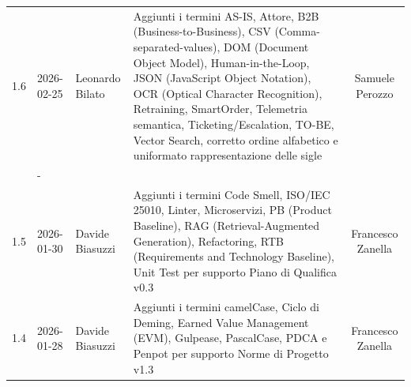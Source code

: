 \documentclass[a4paper, 11pt, oneside]{scrartcl} %
\begin{document}
\begin{center}
{\begin{tabular}{@{}llp{}p{}c@{}}
            1.6                                                                                                                                                            & 2026-02-25      & Leonardo Bilato   & Aggiunti i termini AS-IS, Attore, B2B (Business-to-Business), CSV (Comma-separated-values), DOM (Document Object Model), Human-in-the-Loop, JSON (JavaScript Object Notation), OCR (Optical Character Recognition),
            Retraining, SmartOrder, Telemetria semantica, Ticketing/Escalation, TO-BE, Vector Search, corretto ordine alfabetico e uniformato rappresentazione delle sigle & Samuele Perozzo                                                                                                                                                                                                                                                                                                                                                                                                                                                                                        \\                                                                                                                                   & -                     \\
            1.5                                                                                                                                                            & 2026-01-30      & Davide Biasuzzi   & Aggiunti i termini Code Smell, ISO/IEC 25010, Linter, Microservizi, PB (Product Baseline), RAG (Retrieval-Augmented Generation), Refactoring, RTB (Requirements and Technology Baseline), Unit Test per supporto Piano di Qualifica v0.3                                                                                                                                                                                                 & Francesco Zanella     \\
            1.4                                                                                                                                                            & 2026-01-28      & Davide Biasuzzi   & Aggiunti i termini camelCase, Ciclo di Deming, Earned Value Management (EVM), Gulpease, PascalCase, PDCA e Penpot per supporto Norme di Progetto v1.3                                                                                                                                                                                                                                                                                    & Francesco Zanella     \\

\end{tabular}}
\end{center}
\end{document}

